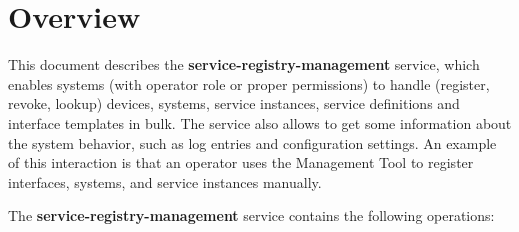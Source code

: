 \documentclass[a4paper]{arrowhead}
\begin{document}
\section{Overview}
\label{sec:overview}
This document describes the \textbf{service-registry-management} service, which enables systems (with operator role or proper permissions) to handle (register, revoke, lookup) devices, systems, service instances, service definitions and interface templates in bulk. The service also allows to get some information about the system behavior, such as log entries and configuration settings. An example of this interaction is that an operator uses the Management Tool to register interfaces, systems, and service instances manually.

The \textbf{service-registry-management} service contains the following operations:
\end{document}
